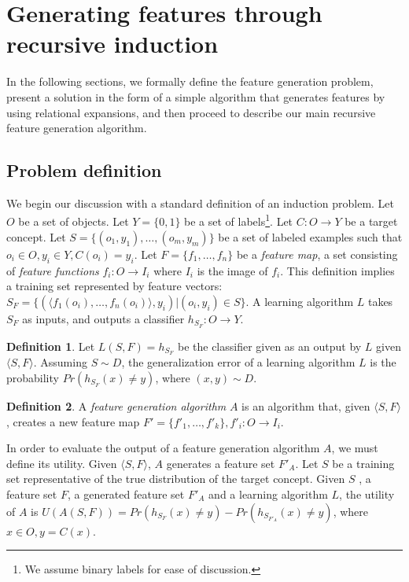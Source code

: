 \documentclass[letterpaper]{article} %
\theoremstyle{definition}
\newtheorem{defn}{Definition}[section]
\begin{document}
\section{Generating features through recursive induction} \label{formal}

In the following sections, we formally define the feature generation problem, present a solution  in the form of a simple algorithm that generates features by using
relational expansions, and then proceed to describe our main recursive feature generation algorithm.

\subsection{Problem definition}

We begin our discussion with a standard definition of an induction problem. 
Let $O$ be a set of objects. Let $Y=\{0,1\}$ be a set of labels\footnote{We assume binary labels for ease of discussion.}. Let $C:O\rightarrow Y$ be a target concept. Let $S=\{(o_{1},y_{1}),\ldots,(o_{m},y_{m})\}$ be a set of labeled examples such that $o_{i}\in O, y_{i}\in Y, C(o_i)=y_i$. 
Let $F=\{f_{1},\ldots,f_{n}\}$ be a \emph{feature map}, a set consisting of \emph{feature functions} $f_{i}:O\rightarrow I_{i}$ where $I_{i}$ is the image of $f_i$.  This definition implies a training set represented by feature vectors: $S_F=\{ (\langle f_1(o_i),\ldots,f_n(o_i)\rangle, y_i) | (o_i,y_i) \in S\}$. A learning algorithm $L$ takes $S_F$ as inputs, and outputs a classifier $h_{S_F}:O\rightarrow Y$.
\begin{defn}
	Let $L(S,F)=h_{S_F}$ be the classifier given as an output by $L$ given $\langle S,F\rangle$. Assuming $S\sim D$, the generalization error of a learning algorithm $L$ is the probability $Pr(h_{S_F}(x)\neq y)$, where $(x,y)\sim D$.
\end{defn}

\begin{defn}
	A \emph{feature generation algorithm} $A$ is an algorithm that, given $\langle S,F\rangle$, creates a new feature map $F'=\{f'_{1},\ldots,f'_{k}\}, f'_{i}:O\rightarrow I_i$.
\end{defn}

In order to evaluate the output of a feature generation algorithm $A$, we must define its utility. Given $\langle S,F \rangle$, $A$ generates a feature set $F'_A$.
Let $S$ be a training set representative of the true distribution of the target concept.
Given $S$ , a feature set $F$, a generated feature set $F'_A$ and a learning algorithm $L$, the utility of $A$ is $U(A(S,F))=Pr(h_{S_F}(x)\neq y)-Pr(h_{S_{F'_A}}(x)\neq y)$, where $x\in O,y=C(x)$.
\end{document}
